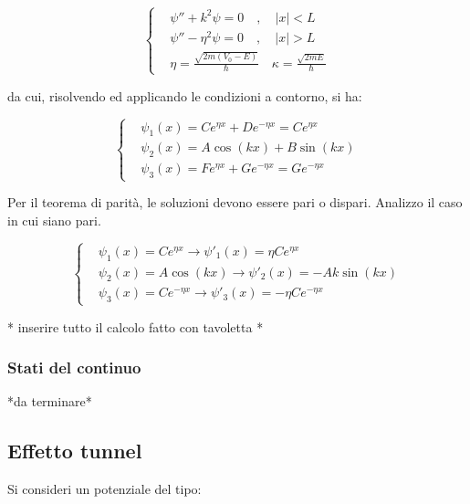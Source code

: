 \documentclass{article}
\begin{document}
\begin{equation}
    \left\{
    \begin{aligned}
         & \psi''+k^2\psi=0 \quad , \quad |x|<L                                        \\
         & \psi''-\eta^2\psi=0 \quad , \quad |x|>L                                     \\
         & \eta= \frac{\sqrt{2m(V_0-E)}}{\hbar} \quad \kappa= \frac{\sqrt{2mE}}{\hbar}
    \end{aligned}
    \right.
\end{equation}

da cui, risolvendo ed applicando le condizioni a contorno, si ha:

\begin{equation}
    \left\{
    \begin{aligned}
         & \psi_1(x)= Ce^{\eta x}+De^{-\eta x}= Ce^{\eta x}  \\
         & \psi_2(x)= A\cos(kx)+B\sin(kx)                    \\
         & \psi_3(x)= Fe^{\eta x}+Ge^{-\eta x}= Ge^{-\eta x}
    \end{aligned}
    \right.
\end{equation}

Per il teorema di parità, le soluzioni devono essere pari o dispari. Analizzo il caso in cui siano pari.

\begin{equation}
    \left\{
    \begin{aligned}
         & \psi_1(x)= Ce^{\eta x} \rightarrow \psi'_1(x)= \eta Ce^{\eta x}    \\
         & \psi_2(x)= A\cos(kx) \rightarrow \psi'_2(x)= -Ak\sin(kx)           \\
         & \psi_3(x)= Ce^{-\eta x} \rightarrow \psi'_3(x)= -\eta Ce^{-\eta x}
    \end{aligned}
    \right.
\end{equation}

* inserire tutto il calcolo fatto con tavoletta *

\subsubsection{Stati del continuo}
*da terminare*

\subsection{Effetto tunnel}
Si consideri un potenziale del tipo:
\end{document}
